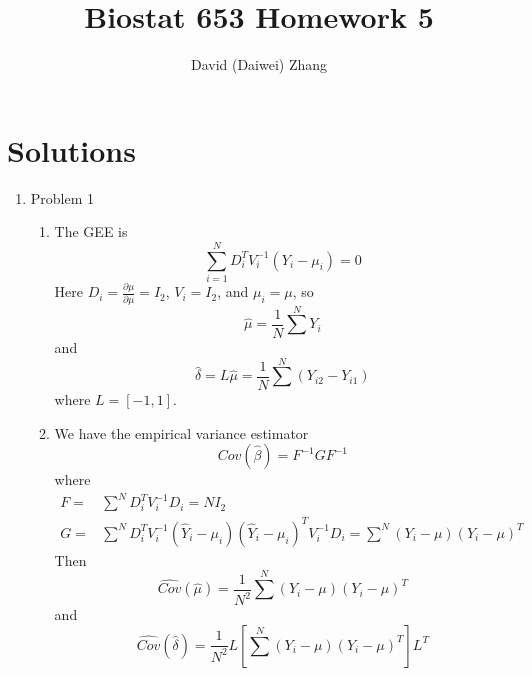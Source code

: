 \documentclass{article}
\title{Biostat 653 Homework 5}
\author{David (Daiwei) Zhang}
\begin{document}
\maketitle

\section{Solutions}

\begin{enumerate}
\item Problem 1
  \begin{enumerate}
  \item The GEE is
    \[
      \sum_{i=1}^N D_i^T V_i^{-1} (Y_i - \mu_i) = 0
    \]
    Here $D_i = \frac{\partial \mu}{\partial\mu} = I_2$, $V_i = I_2$,
    and $\mu_i = \mu$, so
    \[
      \hat{\mu} = \frac{1}{N} \sum^N Y_i
    \]
    and
    \[
      \hat{\delta} = L \hat{\mu} = \frac{1}{N} \sum^N (Y_{i2} -
      Y_{i1})
    \]
    where $L = [-1, 1]$.
  \item We have the empirical variance estimator
    \[
      Cov(\hat{\beta}) = F^{-1} G F^{-1}
    \]
    where
    \begin{align*}
      F = & \sum^N D_i^T V_i^{-1} D_i = NI_2\\
      G = & \sum^N D_i^T V_i^{-1} (\hat{Y}_i - \mu_i)(\hat{Y}_i - \mu_i)^T V_i^{-1} D_i
            = \sum^N (Y_i - \mu)(Y_i - \mu)^T
    \end{align*}
    Then
    \[
      \hat{Cov}(\hat{\mu}) = \frac{1}{N^2} \sum^N (Y_i - \mu)(Y_i -
      \mu)^T
    \]
    and
    \[
      \hat{Cov}(\hat{\delta}) = \frac{1}{N^2} L [\sum^N (Y_i -
      \mu)(Y_i - \mu)^T] L^T
    \]
    

\end{enumerate}
\end{enumerate}
\end{document}
